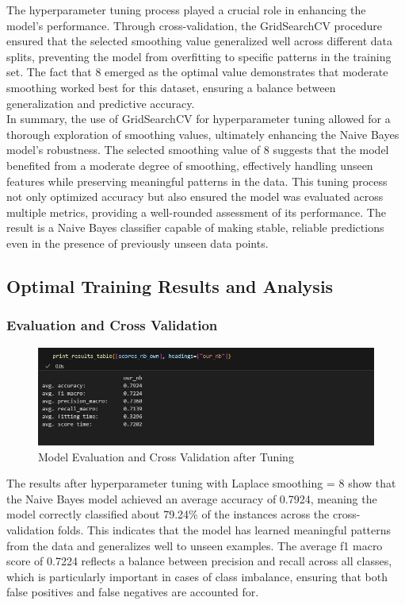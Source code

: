 The hyperparameter tuning process played a crucial role in enhancing the model’s performance. Through cross-validation, the GridSearchCV procedure ensured that the selected smoothing value generalized well across different data splits, preventing the model from overfitting to specific patterns in the training set. The fact that 8 emerged as the optimal value demonstrates that moderate smoothing worked best for this dataset, ensuring a balance between generalization and predictive accuracy.\\

In summary, the use of GridSearchCV for hyperparameter tuning allowed for a thorough exploration of smoothing values, ultimately enhancing the Naive Bayes model's robustness. The selected smoothing value of 8 suggests that the model benefited from a moderate degree of smoothing, effectively handling unseen features while preserving meaningful patterns in the data. This tuning process not only optimized accuracy but also ensured the model was evaluated across multiple metrics, providing a well-rounded assessment of its performance. The result is a Naive Bayes classifier capable of making stable, reliable predictions even in the presence of previously unseen data points.

\subsection{Optimal Training Results and Analysis}
\subsubsection{Evaluation and Cross Validation}

\begin{figure}[hbt!]
    \centering
    \includegraphics[width=1\linewidth]{Images/6.7a.jpg}
    \caption{Model Evaluation and Cross Validation after Tuning}
    \label{fig:enter-label}
\end{figure}

The results after hyperparameter tuning with Laplace smoothing = 8 show that the Naive Bayes model achieved an average accuracy of 0.7924, meaning the model correctly classified about 79.24\% of the instances across the cross-validation folds. This indicates that the model has learned meaningful patterns from the data and generalizes well to unseen examples. The average f1 macro score of 0.7224 reflects a balance between precision and recall across all classes, which is particularly important in cases of class imbalance, ensuring that both false positives and false negatives are accounted for.\\


